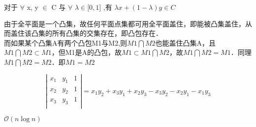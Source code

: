 \documentclass{article}
\begin{document}
对于 $\forall$ x, y $\in$ C 与 $\forall$  $\lambda\in \lbrack 0, 1 \rbrack $ ,有
$\lambda x + (1-\lambda)y \in C$


由于全平面是一个凸集，故任何平面点集都可用全平面盖住，即能被凸集盖住，从而盖住该凸集的所有凸集的交集存在，即凸包存在． \\

而如果某个凸集A有两个凸包M1与M2,则$M1 \bigcap M2$也能盖住凸集A，且$M1 \bigcap M2 \subset M1$，但M1是A的凸包，故$ M1 \subset M1 \bigcap M2$，故$M1 \bigcap M2 = M1$．同理$M1 \bigcap M2 = M2$．即$M1 = M2$


$$
\left|
\begin{matrix}
x_1 & y_1 & 1 \\
x_2 & y_2 & 1 \\
x_3 & y_3 & 1 \\
\end{matrix}
\right| = x_1y_2+x_3y_1+x_2y_3-x_3y_2-x_2y_1-x_1y_3
$$

$\mathcal{O}(n\log{}n)$
\end{document}
